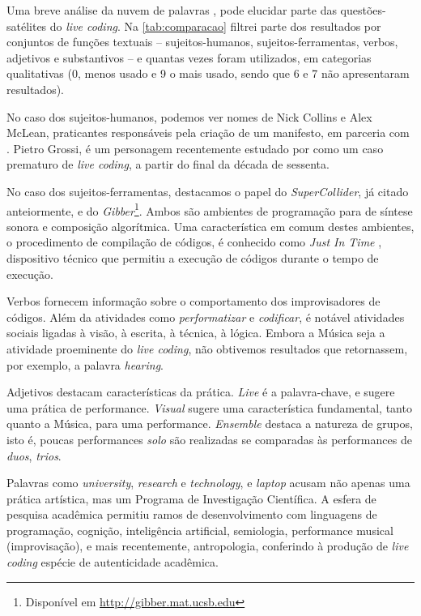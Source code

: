 Uma breve análise da nuvem de palavras ,  pode elucidar parte das questões-satélites do \emph{live coding}. Na \autoref{tab:comparacao} filtrei parte dos resultados por conjuntos de funções textuais -- sujeitos-humanos, sujeitos-ferramentas, verbos, adjetivos e substantivos -- e quantas vezes foram utilizados, em categorias qualitativas (0, menos usado e 9 o mais usado, sendo que 6 e 7 não apresentaram resultados).

No caso dos sujeitos-humanos, podemos ver nomes de Nick Collins e Alex McLean, praticantes responsáveis pela criação de um manifesto, em parceria com . Pietro Grossi, é um personagem recentemente estudado por  como um caso prematuro de \emph{live coding}, a partir do final da década de sessenta.

No caso dos sujeitos-ferramentas, destacamos o papel do \emph{SuperCollider}, já citado anteiormente, e do \emph{Gibber}\cite{roberts_gibber:_2012,wyse_viability_2014}\footnote{Disponível em \url{http://gibber.mat.ucsb.edu}}. Ambos são ambientes de programação para de síntese sonora e composição algorítmica. Uma característica em comum destes ambientes, o procedimento de compilação de códigos, é conhecido como \emph{Just In Time} \cite{aycock_brief_2003}, dispositivo técnico que permitiu a execução de códigos durante o tempo de execução.

Verbos fornecem informação sobre o comportamento dos improvisadores de códigos. Além da atividades como \emph{performatizar} e \emph{codificar}, é notável atividades sociais ligadas à visão, à escrita, à técnica, à lógica. Embora a Música seja a atividade proeminente do \emph{live coding}, não obtivemos resultados que retornassem, por exemplo, a palavra \emph{hearing}. 

Adjetivos destacam características da prática. \emph{Live} é a palavra-chave, e sugere uma prática de performance. \emph{Visual} sugere uma característica fundamental, tanto quanto a Música, para uma performance. \emph{Ensemble} destaca a natureza de grupos, isto é, poucas performances \emph{solo} são realizadas se comparadas às performances de \emph{duos}, \emph{trios}. 

Palavras como \emph{university}, \emph{research} e \emph{technology}, e \emph{laptop} acusam não apenas uma prática artística, mas um Programa de Investigação Científica. A esfera de pesquisa acadêmica permitiu ramos de desenvolvimento com linguagens de programação, cognição, inteligência artificial, semiologia, performance musical (improvisação), e mais recentemente, antropologia, conferindo à produção de \emph{live coding} espécie de autenticidade acadêmica.